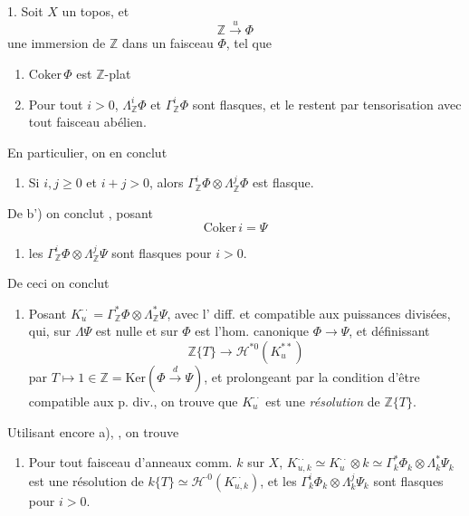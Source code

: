 \documentclass[11pt,a4paper]{article}
\begin{document}
1. Soit $X$ un topos, et
\[
  \mathbb{Z} \xrightarrow{\;u\;} \Phi
\]
une immersion de $\mathbb{Z}$ dans un faisceau $\Phi$, tel que
\begin{enumerate}
  \item[a)] $\mathrm{Coker}\,\Phi$  est $\mathbb{Z}$-plat
  \item[b)] Pour tout $i > 0$, $\Lambda^i_{\mathbb{Z}} \Phi$ et $\Gamma^i_{\mathbb{Z}} \Phi$
  sont flasques, et le restent par tensorisation avec tout faisceau abélien.
  \struck{\ill{}}
\end{enumerate}
En particulier, on en conclut \struck{\ill{}}
\begin{enumerate}
  \item[b')] Si $i, j \geq 0$ et $i + j > 0$, alors \struck{$\Lambda$}
  $\Gamma^i_{\mathbb{Z}} \Phi \otimes \Lambda^j_{\mathbb{Z}} \Phi$ est flasque.
\end{enumerate}
De b') on conclut \struck{\ill{}} , posant
\[
  \mathrm{Coker}\, i = \Psi
\]
\begin{enumerate}
  \item[$\alpha$)]  les $\Gamma^i_{\mathbb{Z}} \Phi \otimes \Lambda^j_{\mathbb{Z}} \Psi$
  sont flasques pour $i > 0$.
\end{enumerate}
De ceci on conclut \struck{\ill{}}
\begin{enumerate}
  \item[$\beta$)] Posant $K^{\cdot\cdot}_u = \Gamma^*_{\mathbb{Z}} \Phi \otimes \Lambda^*_{\mathbb{Z}} \Psi$,
  avec l' diff. \struck{\ill{}} et compatible aux puissances divisées, qui,
  sur \struck{\ill{}} $\Lambda \Psi$ est nulle et sur $\Phi$ est l'hom. canonique
  $\Phi \to \Psi$, et définissant
  \[
    \mathbb{Z}\{T\} \longrightarrow \mathcal{H}^{*0}(K^{**}_u)
  \]
  par $T \mapsto 1 \in \mathbb{Z} = \mathrm{Ker}(\Phi \xrightarrow{d} \Psi)$, et prolongeant
  par la condition d'être compatible aux p. div., on trouve que $K^{\cdot\cdot}_u$ est une
  \emph{résolution} de $\mathbb{Z}\{T\}$.
\end{enumerate}
Utilisant encore a), , on trouve
\begin{enumerate}
  \item[$\gamma$)] Pour tout faisceau d'anneaux comm. $k$ sur $X$,
  $K^{\cdot\cdot}_{u,k} \simeq K^{\cdot\cdot}_u \otimes k \simeq \Gamma^*_k \Phi_k \otimes \Lambda^*_k \Psi_k$
  est une résolution de $k\{T\} \simeq \mathcal{H}^{\cdot 0}(K^{\cdot\cdot}_{u,k})$, et les
  $\Gamma^i_k \Phi_k \otimes \Lambda^j_k \Psi_k$ sont flasques pour $i > 0$.
\end{enumerate}
\end{document}
